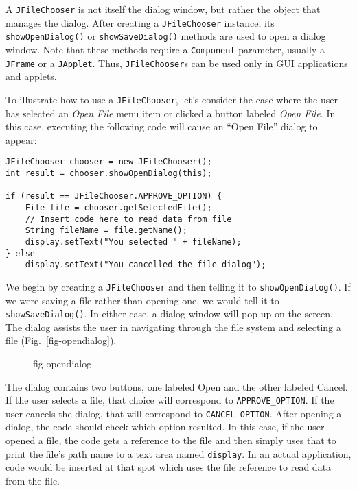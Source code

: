 A {\tt JFileChooser} is not itself the dialog window, but rather the
object that manages the dialog.  After creating a {\tt JFileChooser}
instance, its {\tt showOpenDialog()} or {\tt showSaveDialog()} methods
are used to open a dialog window.  Note that these methods require a
{\tt Component} parameter, usually a {\tt JFrame} or a
{\tt JApplet}. Thus, {\tt JFileChooser}s can be used only in GUI
applications and applets.

To illustrate how to use a {\tt JFileChooser}, let's consider the case
where the user has selected an {\it Open File} menu item or clicked a 
button labeled {\it Open File}.  In this case, executing the 
following code  will cause an ``Open File'' dialog to appear:

\begin{jjjlisting}
\begin{lstlisting}
JFileChooser chooser = new JFileChooser();
int result = chooser.showOpenDialog(this);

if (result == JFileChooser.APPROVE_OPTION) {
    File file = chooser.getSelectedFile();
    // Insert code here to read data from file
    String fileName = file.getName();
    display.setText("You selected " + fileName);
} else
    display.setText("You cancelled the file dialog");
\end{lstlisting}
\end{jjjlisting}


\noindent We begin by creating a {\tt JFileChooser} and then
telling it to {\tt showOpen\-Dia\-log()}. If we were saving a file rather
than opening one, we would tell it to {\tt showSaveDialog()}.  In
either case, a dialog window will pop up on the screen.  The dialog
assists the user in navigating through the file system and selecting a
file (Fig.~\ref{fig-opendialog}).

\begin{figure}[h!]
 {fig-opendialog}
\end{figure}

The dialog contains two buttons, one labeled Open and
the other labeled Cancel.  If the user selects a file, that choice
will correspond to {\tt APPROVE\_OPTION}. If the user cancels the
dialog, that will correspond to {\tt CANCEL\_OPTION}. After
opening a dialog, the code should check which option resulted.  In
this case, if the user opened a file, the code gets a reference to the
file and then simply uses that to print the file's path name to a
text area named {\tt display}.  In an  actual application, code would be
inserted at that spot which uses the file reference to read data from
the file.

